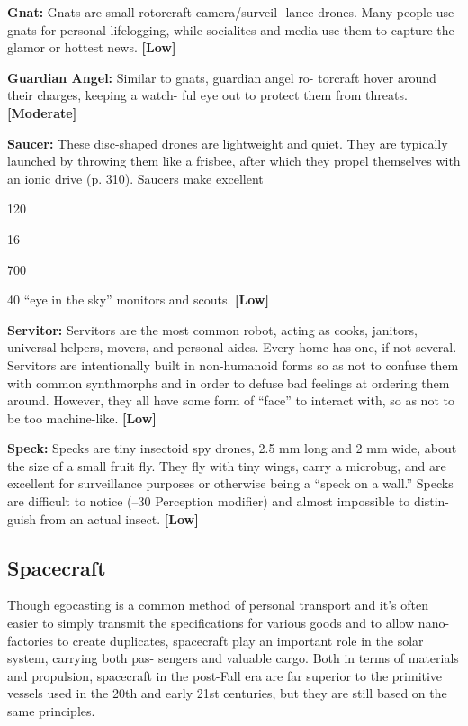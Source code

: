 \textbf{Gnat:} Gnats are small rotorcraft camera/surveil-
lance drones. Many people use gnats for personal 
lifelogging, while socialites and media use them to 
capture the glamor or hottest news. \textbf{[Low]}

\textbf{Guardian Angel:} Similar to gnats, guardian angel ro-
torcraft hover around their charges, keeping a watch-
ful eye out to protect them from threats. \textbf{[Moderate]}

\textbf{Saucer:} These disc-shaped drones are lightweight 
and quiet. They are typically launched by throwing 
them like a frisbee, after which they propel themselves 
with an ionic drive (p. 310). Saucers make excellent 

120

16

700

40
``eye in the sky'' monitors and scouts. \textbf{[Low]}

\textbf{Servitor:  }Servitors are the most common robot, 
acting as cooks, janitors, universal helpers, movers, 
and personal aides. Every home has one, if not several. 
Servitors are intentionally built in non-humanoid 
forms so as not to confuse them with common 
synthmorphs and in order to defuse bad feelings at 
ordering them around. However, they all have some 
form of ``face'' to interact with, so as not to be too 
machine-like. \textbf{[Low]}

\textbf{Speck:} Specks are tiny insectoid spy drones, 2.5 mm 
long and 2 mm wide, about the size of a small fruit fly. 
They fly with tiny wings, carry a microbug, and are 
excellent for surveillance purposes or otherwise being 
a ``speck on a wall.'' Specks are difficult to notice (–30 
Perception modifier) and almost impossible to distin-
guish from an actual insect. \textbf{[Low]}

\subsection{Spacecraft}

Though egocasting is a common method of personal 
transport and it's often easier to simply transmit the 
specifications for various goods and to allow nano-
factories to create duplicates, spacecraft play an 
important role in the solar system, carrying both pas-
sengers and valuable cargo. Both in terms of materials 
and propulsion, spacecraft in the post-Fall era are far 
superior to the primitive vessels used in the 20th and 
early 21st centuries, but they are still based on the 
same principles.

